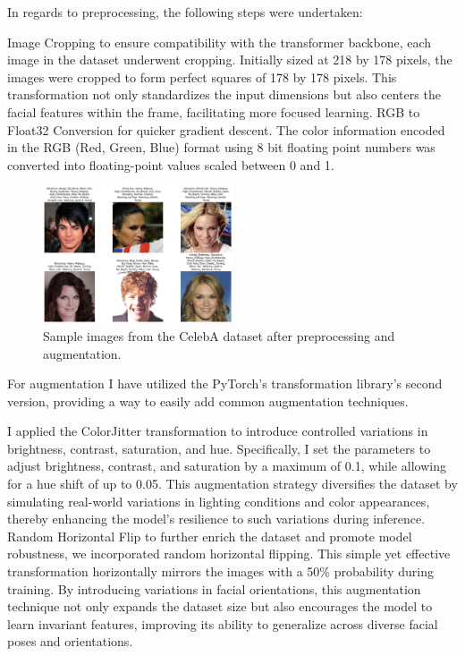 \documentclass[a4paper,oneside]{article}
\begin{document}
In regards to preprocessing, the following steps were undertaken:

Image Cropping to ensure compatibility with the transformer backbone, each image in the dataset underwent cropping.
Initially sized at 218 by 178 pixels, the images were cropped to form perfect squares of 178 by 178 pixels.
This transformation not only standardizes the input dimensions but also centers the facial features within the frame, facilitating more focused learning.
RGB to Float32 Conversion for quicker gradient descent. The color information encoded in the RGB (Red, Green, Blue) format using 8 bit floating point numbers was converted into floating-point values scaled between 0 and 1.

\begin{figure}
  \includegraphics[width=0.5\textwidth]{DatasetSample.png}
  \centering
  \caption{Sample images from the CelebA dataset after preprocessing and augmentation.}
  \centering
  \end{figure}

For augmentation I have utilized the PyTorch's transformation library's second version, providing a way to easily add common augmentation techniques.

I applied the ColorJitter transformation to introduce controlled variations in brightness, contrast, saturation, and hue.
Specifically, I set the parameters to adjust brightness, contrast, and saturation by a maximum of 0.1, while allowing for a hue shift of up to 0.05.
This augmentation strategy diversifies the dataset by simulating real-world variations in lighting conditions and color appearances, thereby enhancing the model's resilience to such variations during inference.
Random Horizontal Flip to further enrich the dataset and promote model robustness, we incorporated random horizontal flipping. This simple yet effective transformation horizontally mirrors the images with a 50\% probability during training.
By introducing variations in facial orientations, this augmentation technique not only expands the dataset size but also encourages the model to learn invariant features, improving its ability to generalize across diverse facial poses and orientations.
\end{document}
